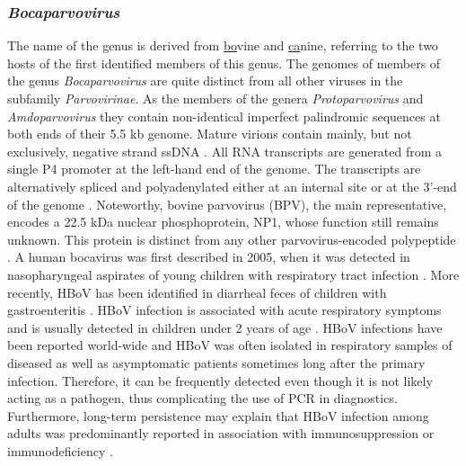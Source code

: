     





\subsubsection{\textit{Bocaparvovirus}}
The name of the genus is derived from \underline{bo}vine and \underline{ca}nine, referring to the two hosts of the first identified members of this genus.  The genomes of members of the genus \textit{Bocaparvovirus} are quite distinct from all other viruses in the subfamily \textit{Parvovirinae}. As the members of the genera \textit{Protoparvovirus} and \textit{Amdoparvovirus} they contain non-identical imperfect palindromic sequences at both ends of their 5.5 kb genome. Mature virions contain mainly, but not exclusively, negative strand ssDNA \cite{pmid3783814,pmid12441065}.
All RNA transcripts are generated from a single P4 promoter at the left-hand end of the genome. The transcripts are alternatively spliced and polyadenylated either at an internal site or at the 3’-end of the genome \cite{pmid17715221}. Noteworthy, bovine parvovirus (BPV), the main representative, encodes a 22.5 kDa nuclear phosphoprotein, NP1, whose function still remains unknown. This protein is distinct from any other parvovirus-encoded polypeptide \cite{pmid6319731}.
A human bocavirus was first described in 2005, when it was detected in nasopharyngeal aspirates of young children with respiratory tract infection \cite{pmid11562506, pmid16118271}. More recently, HBoV has been identified in diarrheal feces of children with gastroenteritis \cite{pmid17553287}. HBoV infection is associated with acute respiratory symptoms and is usually detected in children under 2 years of age \cite{pmid17122013, pmid16517912, pmid17041855}. HBoV infections have been reported world-wide and HBoV was often isolated in respiratory samples of diseased as well as asymptomatic patients sometimes long after the primary infection. Therefore, it can be frequently detected even though it is not likely acting as a pathogen, thus complicating the use of PCR in diagnostics. Furthermore, long-term persistence may explain that HBoV infection among adults was predominantly reported in association with immunosuppression or immunodeficiency \cite{pmid17041855, pmid17176591}.         



